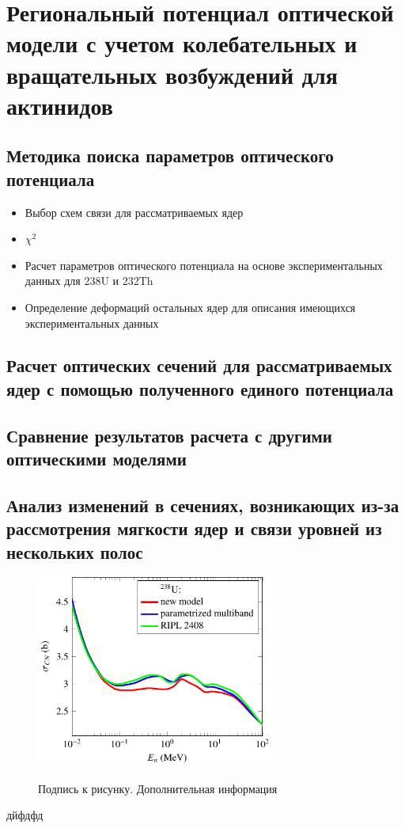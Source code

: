 \chapter{Региональный потенциал оптической модели с учетом колебательных и вращательных возбуждений для актинидов}

\section{Методика поиска параметров оптического потенциала}

\begin{itemize}
    \item Выбор схем связи для рассматриваемых ядер
    \item $\chi^2$
    \item Расчет параметров оптического потенциала на основе экспериментальных 
данных для 238U и 232Th
    \item Определение деформаций остальных ядер для описания имеющихся 
экспериментальных данных
\end{itemize}

\section{Расчет оптических сечений для рассматриваемых ядер с помощью полученного
единого потенциала}

\section{Сравнение результатов расчета с другими оптическими моделями}

\section{Анализ изменений в сечениях, возникающих из-за рассмотрения мягкости ядер и связи уровней из нескольких полос}

\begin{figure}[ht!]
\begin{center}
\includegraphics[width=0.7\textwidth]{images/fig1a.pdf}\\
\caption{Подпись к рисунку. Дополнительная информация}
\label{app:fig}
\end{center}
\end{figure}

дйфдфд \cite{myarticle,myrussianarticle,myproc,mybook}